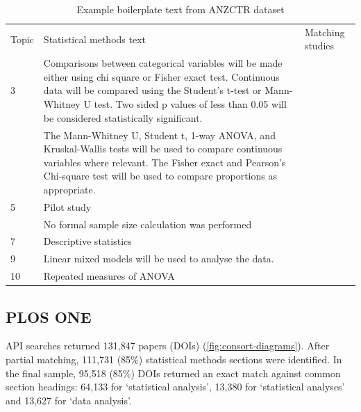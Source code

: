 \documentclass[12pt]{article}
\begin{document}
\begin{landscape}
\begin{table}[]
\centering
\caption{Example boilerplate text from ANZCTR dataset}
\label{tab:anzctr-example-boilerplate}
\begin{tabular}[t]{p{}p{}p{}}
\hline
Topic & Statistical methods text & Matching studies\\
3 & Comparisons between categorical variables will be made either using chi square or Fisher exact test. Continuous data will be compared using the Student’s t-test or Mann-Whitney U test. Two sided p values of less than 0.05 will be considered statistically significant. & \\
 &  The Mann-Whitney U, Student t, 1-way ANOVA, and Kruskal-Wallis tests will be used to compare continuous variables where relevant. The Fisher exact and Pearson’s Chi-square test will be used to compare proportions as appropriate. & \\ \hline
5 & Pilot study & \\
 &  No formal sample size calculation was performed & \\ \hline
7 & Descriptive statistics & \\ \hline
9 & Linear mixed models will be used to analyse the data. & \\ \hline
10 & Repeated measures of ANOVA & \\ \hline
\end{tabular}
\end{table}
\end{landscape}

\subsection{PLOS ONE}\label{plos-one}

API searches returned 131,847 papers (DOIs)
(\autoref{fig:consort-diagrams}). After partial matching, 111,731 (85\%)
statistical methods sections were identified. In the final sample,
95,518 (85\%) DOIs returned an exact match against common section
headings: 64,133 for `statistical analysis', 13,380 for `statistical
analyses' and 13,627 for `data analysis'.
\end{document}

